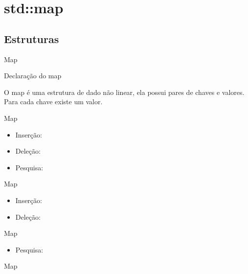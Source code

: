 \section{std::map}

\subsection{Estruturas}

\begin{frame}[fragile]{Map}

    \begin{block}{Declaração do map}
    \end{block}

    O map é uma estrutura de dado não linear, ela possui pares de chaves e valores. Para cada chave existe um valor.

\end{frame}

\begin{frame}[fragile]{Map}

    \begin{itemize}
        \item Inserção:
        \item Deleção: 
        \item Pesquisa: 
    \end{itemize}

\end{frame}

\begin{frame}[fragile]{Map}

    \begin{itemize}
        \item Inserção:
        \item Deleção:
    \end{itemize}

\end{frame}

\begin{frame}[fragile]{Map}

    \begin{itemize}
        \item Pesquisa:
    \end{itemize}

\end{frame}

\begin{frame}[fragile]{Map}


\end{frame}
